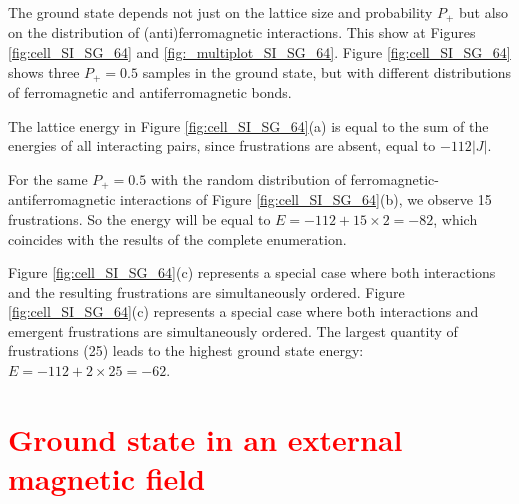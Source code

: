 \documentclass[preprint,12pt]{elsarticle}
\begin{document}
	The ground state depends not just on the lattice size and probability $P_+$ but also on the distribution of (anti)ferromagnetic interactions. This show at Figures \ref{fig:cell_SI_SG_64} and \ref{fig:_multiplot_SI_SG_64}. Figure \ref{fig:cell_SI_SG_64} shows three $P_+ = 0.5$ samples in the ground state, but with different distributions of ferromagnetic and antiferromagnetic bonds.
	
	The lattice energy in Figure \ref{fig:cell_SI_SG_64}(a) is equal to the sum of the energies of all interacting pairs, since frustrations are absent, equal to $-112|J|$.
	
	For the same $P_+ = 0.5$ with the random distribution of ferromagnetic-antiferromagnetic interactions of Figure \ref{fig:cell_SI_SG_64}(b), we observe 15 frustrations. So the energy will be equal to $E = -112 + 15\times2 = -82$, which coincides with the results of the complete enumeration.
	
	Figure \ref{fig:cell_SI_SG_64}(c) represents a special case where both interactions and the resulting frustrations are simultaneously ordered. Figure \ref{fig:cell_SI_SG_64}(c) represents a special case where both interactions and emergent frustrations are simultaneously ordered. The largest quantity of frustrations (25) leads to the highest ground state energy: $E = -112 + 2\times25 = -62$.
	

	\section{\textcolor{red}{Ground state in an external magnetic field}}
\end{document}
